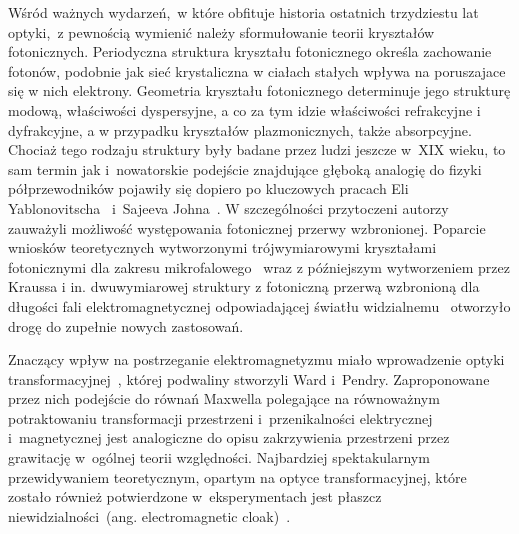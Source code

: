 
Wśród ważnych wydarzeń,~w które obfituje historia ostatnich trzydziestu lat optyki,~z pewnością wymienić należy sformułowanie teorii kryształów fotonicznych. Periodyczna struktura kryształu fotonicznego określa zachowanie fotonów, podobnie jak sieć krystaliczna w ciałach stałych wpływa na poruszajace się w nich elektrony. Geometria kryształu fotonicznego determinuje jego strukturę modową, właściwości dyspersyjne, a co za tym idzie właściwości refrakcyjne i dyfrakcyjne, a w przypadku kryształów plazmonicznych, także absorpcyjne. Chociaż tego rodzaju struktury były badane przez ludzi jeszcze w~XIX wieku, to sam termin jak i~nowatorskie podejście znajdujące głęboką analogię do fizyki półprzewodników pojawiły się dopiero po kluczowych pracach Eli Yablonovitscha~\cite{yablonovitch1987inhibited} i~Sajeeva Johna~\cite{john1987strong}. W szczególności przytoczeni autorzy zauważyli możliwość występowania fotonicznej przerwy wzbronionej. Poparcie wniosków teoretycznych wytworzonymi trójwymiarowymi kryształami fotonicznymi dla zakresu mikrofalowego~\cite{yablonovitch1991photonic} wraz z późniejszym wytworzeniem przez Kraussa i in. dwuwymiarowej struktury z fotoniczną przerwą wzbronioną dla długości fali elektromagnetycznej odpowiadającej światłu widzialnemu~\cite{krauss1996two} otworzyło drogę do zupełnie nowych zastosowań.

Znaczący wpływ na postrzeganie elektromagnetyzmu miało wprowadzenie optyki transformacyjnej~\cite{ward1996refraction,han2008ray,kildishev2008engineering,li2009designing,gao2016translation}, której podwaliny stworzyli Ward i~Pendry. Zaproponowane  przez nich podejście do równań Maxwella polegające na równoważnym potraktowaniu transformacji przestrzeni i~przenikalności elektrycznej i~magnetycznej jest analogiczne do opisu zakrzywienia przestrzeni przez grawitację w~ogólnej teorii względności. Najbardziej spektakularnym przewidywaniem teoretycznym, opartym na optyce transformacyjnej, które zostało również potwierdzone w~eksperymentach jest płaszcz niewidzialności~(ang. electromagnetic cloak)~\cite{schurig2006metamaterial,sun2016optic,alitalo2009electromagnetic}.

